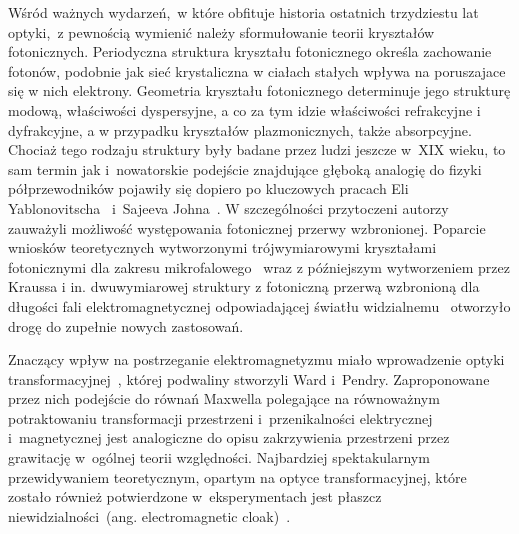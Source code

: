 
Wśród ważnych wydarzeń,~w które obfituje historia ostatnich trzydziestu lat optyki,~z pewnością wymienić należy sformułowanie teorii kryształów fotonicznych. Periodyczna struktura kryształu fotonicznego określa zachowanie fotonów, podobnie jak sieć krystaliczna w ciałach stałych wpływa na poruszajace się w nich elektrony. Geometria kryształu fotonicznego determinuje jego strukturę modową, właściwości dyspersyjne, a co za tym idzie właściwości refrakcyjne i dyfrakcyjne, a w przypadku kryształów plazmonicznych, także absorpcyjne. Chociaż tego rodzaju struktury były badane przez ludzi jeszcze w~XIX wieku, to sam termin jak i~nowatorskie podejście znajdujące głęboką analogię do fizyki półprzewodników pojawiły się dopiero po kluczowych pracach Eli Yablonovitscha~\cite{yablonovitch1987inhibited} i~Sajeeva Johna~\cite{john1987strong}. W szczególności przytoczeni autorzy zauważyli możliwość występowania fotonicznej przerwy wzbronionej. Poparcie wniosków teoretycznych wytworzonymi trójwymiarowymi kryształami fotonicznymi dla zakresu mikrofalowego~\cite{yablonovitch1991photonic} wraz z późniejszym wytworzeniem przez Kraussa i in. dwuwymiarowej struktury z fotoniczną przerwą wzbronioną dla długości fali elektromagnetycznej odpowiadającej światłu widzialnemu~\cite{krauss1996two} otworzyło drogę do zupełnie nowych zastosowań.

Znaczący wpływ na postrzeganie elektromagnetyzmu miało wprowadzenie optyki transformacyjnej~\cite{ward1996refraction,han2008ray,kildishev2008engineering,li2009designing,gao2016translation}, której podwaliny stworzyli Ward i~Pendry. Zaproponowane  przez nich podejście do równań Maxwella polegające na równoważnym potraktowaniu transformacji przestrzeni i~przenikalności elektrycznej i~magnetycznej jest analogiczne do opisu zakrzywienia przestrzeni przez grawitację w~ogólnej teorii względności. Najbardziej spektakularnym przewidywaniem teoretycznym, opartym na optyce transformacyjnej, które zostało również potwierdzone w~eksperymentach jest płaszcz niewidzialności~(ang. electromagnetic cloak)~\cite{schurig2006metamaterial,sun2016optic,alitalo2009electromagnetic}.

